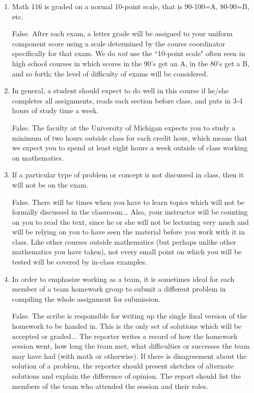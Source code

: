 \documentclass[11pt,letterpaper]{article}
\begin{document}
\begin{enumerate}
\item  Math 116 is graded on a normal 10-point scale, that is 90-100=A, 80-90=B, etc.  

\vspace{.5pc}
False.  After each exam, a letter grade will be assigned to your uniform component score using a scale determined by the course coordinator specifically for that exam.  We do {\em not} use the ``10-point scale" often seen in high school courses in which scores in the 90's get an A, in the 80's get a B, and so forth; the level of difficulty of exams will be considered.

\item  In general, a student should expect to do well in this course if he/she completes all assignments, reads each section before class, and puts in 3-4 hours of study time a week.

\vspace{.5pc}
False.  The faculty at the University of Michigan expects you to study a minimum of two hours outside class for each credit hour, which means that we expect you to spend at least eight hours a week outside of class working on mathematics.

\item If a particular type of problem or concept is not discussed in class, then it will not be on the exam.

\vspace{.5pc}
False.  There will be times when you have to learn topics which will not be formally discussed in the classroom...  Also, your instructor will be counting on you to read the text, since he or she will not be lecturing very much and will be relying on you to have seen the material before you work with it in class.  Like other courses outside mathematics (but perhaps unlike other mathematics you have taken), not every small point on which you will be tested will be covered by in-class examples.

\item In order to emphasize working as a team, it is sometimes ideal for each member of a team homework group to submit a different problem in compiling the whole assignment for submission.

\vspace{.5pc}
False.  The scribe is responsible for writing up the single final version of the homework to be handed in.  This is the only set of solutions which will be accepted or graded... The reporter writes a record of how the homework session went, how long the team met, what difficulties or successes the team may have had (with math or otherwise).  If there is disagreement about the solution of a problem, the reporter should present sketches of alternate solutions and explain the difference of opinion.  The report should list the members of the team who attended the session and their roles.


\end{enumerate}
\end{document}
